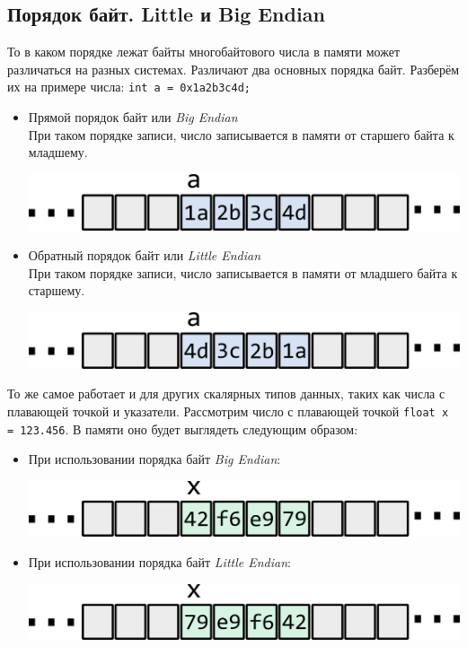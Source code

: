 \documentclass[10pt]{article}
\begin{document}
\subsection*{Порядок байт. Little и Big Endian}
То в каком порядке лежат байты многобайтового числа в памяти может различаться на разных системах. Различают два основных порядка байт. Разберём их на примере числа: \texttt{int a = 0x1a2b3c4d;}
\begin{itemize}
\item Прямой порядок байт или \textit{Big Endian}\\
При таком порядке записи, число записывается в памяти от старшего байта к младшему. 
\begin{center}
\includegraphics[scale=0.9]{../images/memory/lb_big_int.png}
\end{center}

\item Обратный порядок байт или \textit{Little Endian}\\
При таком порядке записи, число записывается в памяти от младшего байта к старшему. 
\begin{center}
\includegraphics[scale=0.9]{../images/memory/lb_little_int.png}
\end{center}
\end{itemize}
То же самое работает и для других скалярных типов данных, таких как числа с плавающей точкой и указатели. Рассмотрим число с плавающей точкой \texttt{float x = 123.456}. В памяти оно будет выглядеть следующим образом:
\begin{itemize}
\item При использовании порядка байт \textit{Big Endian}:\\
\begin{center}
\includegraphics[scale=0.9]{../images/memory/lb_big_float.png}
\end{center}

\item При использовании порядка байт \textit{Little Endian}:\\
\begin{center}
\includegraphics[scale=0.9]{../images/memory/lb_little_float.png}
\end{center}
\end{itemize}
\end{document}
